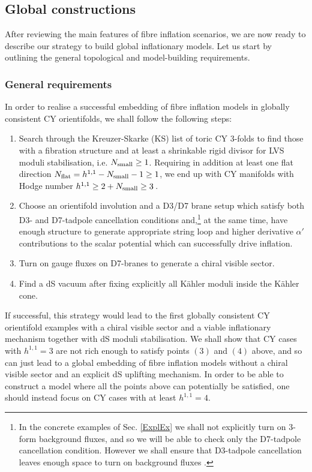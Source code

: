 \documentclass[11pt,a4paper]{article}
\newcommand{\ben}{\begin{enumerate}}
\newcommand{\een}{\end{enumerate}}
\begin{document}
\subsection{Global constructions}

After reviewing the main features of fibre inflation scenarios, we are now ready to describe our strategy to build global inflationary models. Let us start by outlining the general topological and model-building requirements.

\subsubsection{General requirements}

In order to realise a successful embedding of fibre inflation models in globally consistent CY orientifolds, we shall follow the following steps: 
\ben
\item Search through the Kreuzer-Skarke (KS) list of toric CY 3-folds \cite{Kreuzer:2000xy} to find those with a fibration structure and at least a shrinkable rigid divisor for LVS moduli stabilisation, i.e. $N_{\rm small}\geq 1$. Requiring in addition at least one flat direction $N_{\rm flat}=h^{1,1}-N_{\rm small}-1\geq 1$, we end up with CY manifolds with Hodge number $h^{1,1}\geq 2+N_{\rm small}\geq 3\,$.

\item Choose an orientifold involution and a D3/D7 brane setup which satisfy both D3- and D7-tadpole cancellation conditions and,\footnote{In the concrete examples of Sec. \ref{ExplEx} we shall not explicitly turn on 3-form background fluxes, and so we will be able to check only the D7-tadpole cancellation condition. However we shall ensure that D3-tadpole cancellation leaves enough space to turn on background fluxes \cite{Cicoli:2011qg}.} at the same time, have enough structure to generate appropriate string loop and higher derivative $\alpha'$ contributions to the scalar potential which can successfully drive inflation.

\item Turn on gauge fluxes on D7-branes to generate a chiral visible sector. 

\item Find a dS vacuum after fixing explicitly all K\"ahler moduli inside the K\"ahler cone.  
\een

If successful, this strategy would lead to the first globally consistent CY orientifold examples with a chiral visible sector and a viable inflationary mechanism together with dS moduli stabilisation. We shall show that CY cases with $h^{1,1}=3$ are not rich enough to satisfy points $(3)$ and $(4)$ above, and so can just lead to a global embedding of fibre inflation models without a chiral visible sector and an explicit dS uplifting mechanism. In order to be able to construct a model where all the points above can potentially be satisfied, one should instead focus on CY cases with at least $h^{1,1}=4$.
\end{document}
